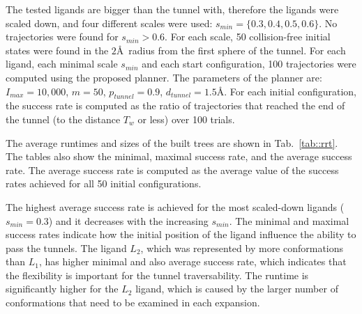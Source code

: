 \documentclass{svmult}
\def\dt{d_{tunnel}}
\def\rv{T_w}
\def\Imax{I_{max}} %
\def\smin{s_{min}}
\def\gb{p_{tunnel}}
\def\LA{L_1}
\def\LB{L_2}
\begin{document}
The tested ligands are bigger than the tunnel with, therefore the ligands were scaled down, and four
different scales were used: $\smin=\{0.3,0.4,0.5,0.6\}$.
No trajectories were found for $\smin > 0.6$.
For each scale, 50 collision-free initial states were found in the $2$\AA\ radius from the first sphere of the tunnel.
For each ligand, each minimal scale $\smin$ and each start configuration, 100 trajectories were computed using the proposed planner.
The parameters of the planner are: $\Imax=10,000$, $m=50$, $\gb=0.9$, $\dt=1.5$\AA.
For each initial configuration, the success rate is computed as the ratio of trajectories that reached the end of the tunnel (to the distance $\rv$ or less) over 100 trials.

The average runtimes and sizes of the built trees are shown in Tab.~\ref{tab::rrt}.
The tables also show the minimal, maximal success rate, and the average success rate.
The average success rate is computed as the average value of the success rates achieved for all 50 initial configurations.

The highest average success rate is achieved for the most scaled-down ligands ($\smin=0.3$) and it decreases with the increasing $\smin$. 
The minimal and maximal success rates indicate how the initial position of the ligand influence the ability to pass the tunnels.
The ligand $\LB$, which was represented by more conformations than $\LA$, has higher minimal and also average success rate, which
indicates that the flexibility is important for the tunnel traversability.
The runtime is significantly higher for the $\LB$ ligand, which is caused by the larger number of conformations that need to be
examined in each expansion.


\def\tmpa{0.13\textwidth}
\end{document}
